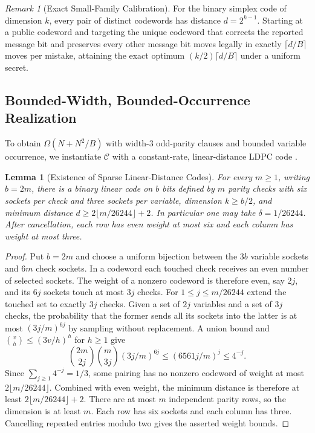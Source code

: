 \documentclass[11pt,a4paper]{article}
\newtheorem{lemma}[theorem]{Lemma}
\theoremstyle{definition}
\theoremstyle{remark}
\newtheorem{remark}[theorem]{Remark}
\begin{document}
\begin{remark}[Exact Small-Family Calibration]\label{rem:simplex}
For the binary simplex code of dimension $k$, every pair of distinct codewords has distance $d = 2^{k-1}$. Starting at a public codeword and targeting the unique codeword that corrects the reported message bit and preserves every other message bit moves legally in exactly $\lceil d/B \rceil$ moves per mistake, attaining the exact optimum $(k/2)\lceil d/B \rceil$ under a uniform secret.
\end{remark}

\subsection{Bounded-Width, Bounded-Occurrence Realization}

To obtain $\Omega(N + N^2/B)$ with width-$3$ odd-parity clauses and bounded variable occurrence, we instantiate $\mathcal{C}$ with a constant-rate, linear-distance LDPC code \cite{gallager1962}.

\begin{lemma}[Existence of Sparse Linear-Distance Codes]\label{lem:ldpc}
For every $m \ge 1$, writing $b=2m$, there is a binary linear code on $b$ bits defined by $m$ parity checks with six sockets per check and three sockets per variable, dimension $k \ge b/2$, and minimum distance $d \ge 2\lfloor m/26244\rfloor + 2$. In particular one may take $\delta = 1/26244$. After cancellation, each row has even weight at most six and each column has weight at most three.
\end{lemma}

\begin{proof}
Put $b=2m$ and choose a uniform bijection between the $3b$ variable sockets and $6m$ check sockets. In a codeword each touched check receives an even number of selected sockets. The weight of a nonzero codeword is therefore even, say $2j$, and its $6j$ sockets touch at most $3j$ checks. For $1\le j\le m/26244$ extend the touched set to exactly $3j$ checks. Given a set of $2j$ variables and a set of $3j$ checks, the probability that the former sends all its sockets into the latter is at most $(3j/m)^{6j}$ by sampling without replacement. A union bound and $\binom{v}{h}\le(3v/h)^h$ for $h\ge 1$ give
\[
  \binom{2m}{2j}\binom{m}{3j}(3j/m)^{6j}
       \le (6561j/m)^j \le 4^{-j}.
\]
Since $\sum_{j\ge1}4^{-j}=1/3$, some pairing has no nonzero codeword of weight at most $2\lfloor m/26244\rfloor$. Combined with even weight, the minimum distance is therefore at least $2\lfloor m/26244\rfloor + 2$. There are at most $m$ independent parity rows, so the dimension is at least $m$. Each row has six sockets and each column has three. Cancelling repeated entries modulo two gives the asserted weight bounds.
\end{proof}
\end{document}
